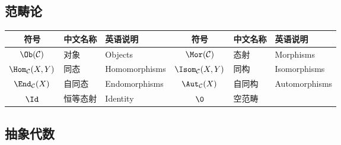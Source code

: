 \documentclass[UTF8]{ctexart}
\begin{document}
        \subsection{范畴论}
        
            \begin{center}
                \begin{tabular}{|c|l|l||c|l|l|}
                    \hline
                    符号 & 中文名称 & 英语说明 & 符号 & 中文名称 & 英语说明\\
                    \hline\hline
                    $\Ob(\mathcal{C})$ & 对象 & Objects & $\Mor(\mathcal{C})$ & 态射 & Morphisms\\
                    \hline
                    $\Hom_\mathcal{C}(X,Y)$ & 同态 & Homomorphisms & $\Isom_\mathcal{C}(X,Y)$ & 同构 & Isomorphisms\\
                    \hline
                    $\End_\mathcal{C}(X)$ & 自同态 & Endomorphisms & $\Aut_\mathcal{C}(X)$ & 自同构 & Automorphisms\\
                    \hline
                    $\Id$ & 恒等态射 & Identity & $\0$ & 空范畴 &\\
                    \hline
                \end{tabular}
            \end{center}

        \subsection{抽象代数}
        
\end{document}
